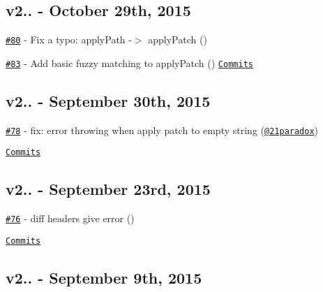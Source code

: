 \subsection*{v2.. -\/ October 29th, 2015}


\begin{DoxyItemize}
\item \href{https://github.com/kpdecker/jsdiff/pull/80}{\tt \#80} -\/ Fix a typo\+: apply\+Path -\/$>$ apply\+Patch (\href{https://api.github.com/users/fluxxu}{\tt })
\item \href{https://github.com/kpdecker/jsdiff/pull/83}{\tt \#83} -\/ Add basic fuzzy matching to apply\+Patch (\href{https://github.com/piranna}{\tt }) \href{https://github.com/kpdecker/jsdiff/compare/v2.1.3...v2.2.0}{\tt Commits}
\end{DoxyItemize}

\subsection*{v2.. -\/ September 30th, 2015}


\begin{DoxyItemize}
\item \href{https://github.com/kpdecker/jsdiff/pull/78}{\tt \#78} -\/ fix\+: error throwing when apply patch to empty string (\href{https://api.github.com/users/21paradox}{\tt @21paradox})
\end{DoxyItemize}

\href{https://github.com/kpdecker/jsdiff/compare/v2.1.2...v2.1.3}{\tt Commits}

\subsection*{v2.. -\/ September 23rd, 2015}


\begin{DoxyItemize}
\item \href{https://github.com/kpdecker/jsdiff/issues/76}{\tt \#76} -\/ diff headers give error (\href{https://api.github.com/users/piranna}{\tt })
\end{DoxyItemize}

\href{https://github.com/kpdecker/jsdiff/compare/v2.1.1...v2.1.2}{\tt Commits}

\subsection*{v2.. -\/ September 9th, 2015}


